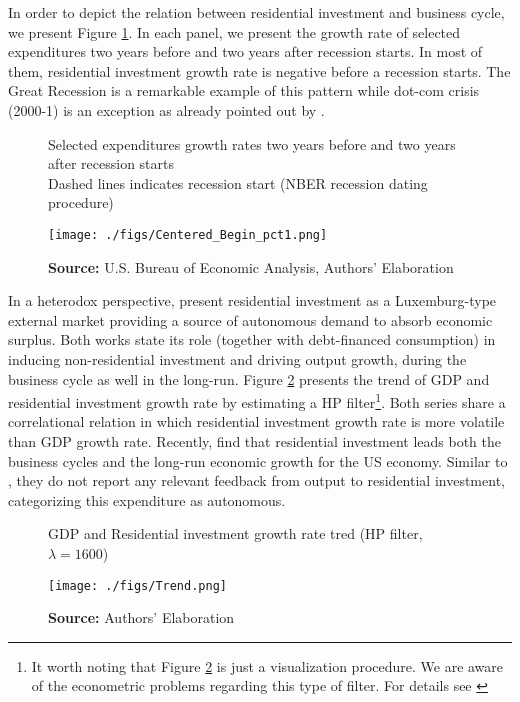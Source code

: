 \documentclass[12pt, a4paper]{article}
\begin{document}
In order to depict the relation between residential investment and business cycle, we present Figure \ref{fig:cycle}.
In each panel, we present the growth rate of selected expenditures two years before and two years after recession starts.
In most of them, residential investment growth rate is negative before a recession starts.
The Great Recession is a remarkable example of this pattern while dot-com crisis (2000-1) is an exception as already pointed out by \textcite{leamer_housing_2007}.


\begin{figure}[H]
	\centering
	\caption{Selected expenditures growth rates two years before and two years after recession starts\\Dashed lines indicates recession start (NBER recession dating procedure)}
	\label{fig:cycle}
	\texttt{[image: ./figs/Centered\_Begin\_pct1.png]}
	\caption*{\textbf{Source:} U.S. Bureau of Economic Analysis, Authors' Elaboration}
\end{figure}


In a heterodox perspective, \textcites{fiebiger_semi-autonomous_2018}{fiebiger_trend_2017} present residential investment as a Luxemburg-type external market providing a source of autonomous demand to absorb economic surplus.
Both works state its role (together with debt-financed consumption) in inducing non-residential investment and driving output growth, during the business cycle as well in the long-run.
Figure \ref{fig:trend} presents the trend of GDP and residential investment growth rate by estimating a HP filter\footnote{It worth noting that Figure \ref{fig:trend} is just a visualization procedure. We are aware of the econometric problems regarding this type of filter. For details see \textcite{NBER_HP}}.
Both series share a correlational relation in which residential investment growth rate is more volatile than GDP growth rate.
Recently, \textcite{perez_Montiel_2021} find that residential investment leads both the business cycles and the long-run economic growth for the US economy.
Similar to \textcite{girardi_long-run_2016}, they do not report any relevant feedback from output to residential investment, categorizing this expenditure as autonomous.

\begin{figure}[H]
	\centering
	\caption{GDP and Residential investment growth rate tred (HP filter, $\lambda = 1600$)}
	\label{fig:trend}
	\texttt{[image: ./figs/Trend.png]}
	\caption*{\textbf{Source:} Authors' Elaboration}
\end{figure}
\end{document}
